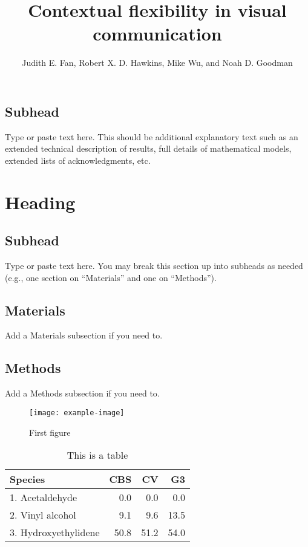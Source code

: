 \documentclass[9pt,twoside,lineno]{pnas-new}
\title{Contextual flexibility in visual communication}
\author{Judith E. Fan, Robert X. D. Hawkins, Mike Wu, and Noah D. Goodman}
\begin{document}
\maketitle

\SItext

\subsection*{Subhead}
Type or paste text here. This should be additional explanatory text such as an extended technical description of results, full details of mathematical models, extended lists of acknowledgments, etc.  

\section*{Heading}
\subsection*{Subhead}
Type or paste text here. You may break this section up into subheads as needed (e.g., one section on ``Materials'' and one on ``Methods'').

\subsection*{Materials}
Add a Materials subsection if you need to.

\subsection*{Methods}
Add a Methods subsection if you need to.


\begin{figure}
\centering
\texttt{[image: example-image]}
\caption{First figure}
\end{figure}

\begin{table}\centering
\caption{This is a table}

\begin{tabular}{lrrr}
Species & CBS & CV & G3 \\
\midrule
1. Acetaldehyde & 0.0 & 0.0 & 0.0 \\
2. Vinyl alcohol & 9.1 & 9.6 & 13.5 \\
3. Hydroxyethylidene & 50.8 & 51.2 & 54.0\\
\bottomrule
\end{tabular}
\end{table}

\FloatBarrier


\end{document}
